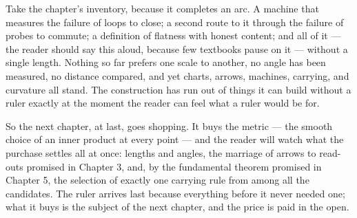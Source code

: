 Take the chapter's inventory, because it completes an arc. A machine
that measures the failure of loops to close; a second route to it
through the failure of probes to commute; a definition of flatness with
honest content; and all of it --- the reader should say this aloud,
because few textbooks pause on it --- without a single length. Nothing
so far prefers one scale to another, no angle has been measured, no
distance compared, and yet charts, arrows, machines, carrying, and
curvature all stand. The construction has run out of things it can
build without a ruler exactly at the moment the reader can feel what a
ruler would be for.

So the next chapter, at last, goes shopping. It buys the metric --- the
smooth choice of an inner product at every point --- and the reader will
watch what the purchase settles all at once: lengths and angles, the
marriage of arrows to read-outs promised in Chapter 3, and, by the
fundamental theorem promised in Chapter 5, the selection of exactly one
carrying rule from among all the candidates. The ruler arrives last
because everything before it never needed one; what it buys is the
subject of the next chapter, and the price is paid in the open.
